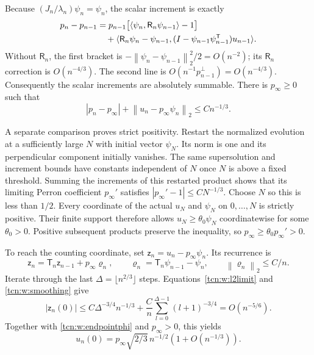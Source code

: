 \documentclass[11pt,letterpaper]{article}
\newcommand{\norm}[1]{\left\lVert#1\right\rVert}
\newcommand{\ip}[2]{\langle#1,#2\rangle}
\theoremstyle{remark}
\begin{document}
Because $(J_n/\lambda_n)\psi_n=\psi_n$, the scalar increment is exactly
\begin{align}
 p_n-p_{n-1}
 &=p_{n-1}\bigl[\ip{\psi_n}{\mathsf R_n\psi_{n-1}}-1\bigr]\notag\\
 &\quad+\ip{\mathsf R_n\psi_n-\psi_{n-1}}
 {(I-\psi_{n-1}\psi_{n-1}^{\mathsf T})u_{n-1}}.\label{tcn:w:increment}
\end{align}
Without $\mathsf R_n$, the first bracket is $-\norm{\psi_n-\psi_{n-1}}_2^2/2=O(n^{-2})$; its $\mathsf R_n$ correction is $O(n^{-4/3})$. The second line is $O(n^{-1}p_{n-1}^\perp)=O(n^{-4/3})$. Consequently the scalar increments are absolutely summable. There is $p_\infty\ge0$ such that
\begin{equation}\label{tcn:w:l2limit}
 |p_n-p_\infty|+\norm{u_n-p_\infty\psi_n}_2\le Cn^{-1/3}.
\end{equation}

A separate comparison proves strict positivity. Restart the normalized evolution at a sufficiently large $N$ with initial vector $\psi_N$. Its norm is one and its perpendicular component initially vanishes. The same supersolution and increment bounds have constants independent of $N$ once $N$ is above a fixed threshold. Summing the increments of this restarted product shows that its limiting Perron coefficient $p_\infty'$ satisfies $|p_\infty'-1|\le CN^{-1/3}$. Choose $N$ so this is less than $1/2$.
Every coordinate of the actual $u_N$ and $\psi_N$ on $0,\ldots,N$ is strictly positive. Their finite support therefore allows $u_N\ge\theta_0\psi_N$ coordinatewise for some $\theta_0>0$. Positive subsequent products preserve the inequality, so $p_\infty\ge\theta_0p_\infty'>0$.

To reach the counting coordinate, set $\mathsf z_n=u_n-p_\infty\psi_n$. Its recurrence is
\[
 \mathsf z_n=\mathsf T_n\mathsf z_{n-1}+p_\infty\varrho_n,\qquad
 \varrho_n=\mathsf T_n\psi_{n-1}-\psi_n,\qquad\norm{\varrho_n}_2\le C/n.
\]
Iterate through the last $\Delta=\lfloor n^{2/3}\rfloor$ steps. Equations~\eqref{tcn:w:l2limit} and \eqref{tcn:w:smoothing} give
\[
 |\mathsf z_n(0)|\le C\Delta^{-3/4}n^{-1/3}
       +\frac Cn\sum_{l=0}^{\Delta-1}(l+1)^{-3/4}=O(n^{-5/6}).
\]
Together with \eqref{tcn:w:endpointphi} and $p_\infty>0$, this yields
\begin{equation}\label{tcn:w:vboundary}
 u_n(0)=p_\infty\sqrt{2/3}\,n^{-1/2}(1+O(n^{-1/3})).
\end{equation}
\end{document}

